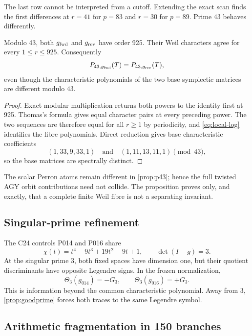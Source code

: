 The last row cannot be interpreted from a cutoff.  Extending the exact scan
finds the first differences at \(r=41\) for \(p=83\) and \(r=30\) for
\(p=89\).  Prime 43 behaves differently.

\begin{proposition}[Complete \(p=43\) finite-fibre collision]
\label{prop:p43}
Modulo 43, both \(g_{\rm fwd}\) and \(g_{\rm rev}\) have order 925.  Their
Weil characters agree for every \(1\le r\le925\).  Consequently
\[
P_{43,g_{\rm fwd}}(T)=P_{43,g_{\rm rev}}(T),
\]
even though the characteristic polynomials of the two base symplectic
matrices are different modulo 43.
\end{proposition}

\begin{proof}
Exact modular multiplication returns both powers to the identity first at
925.  Thomas's formula gives equal character pairs at every preceding power.
The two sequences are therefore equal for all \(r\ge1\) by periodicity, and
\cref{eq:local-log} identifies the fibre polynomials.  Direct reduction gives
base characteristic coefficients
\[
(1,33,9,33,1)\quad\text{and}\quad(1,11,13,11,1)
\pmod{43},
\]
so the base matrices are spectrally distinct.
\end{proof}

The scalar Perron atoms remain different in \cref{prop:p43}; hence the full
twisted AGY orbit contributions need not collide.  The proposition proves
only, and exactly, that a complete finite Weil fibre is not a separating
invariant.

\subsection{Singular-prime refinement}

The C24 controls P014 and P016 share
\[
\chi(t)=t^4-9t^3+19t^2-9t+1,
\qquad \det(I-g)=3.
\]
At the singular prime 3, both fixed spaces have dimension one, but their
quotient discriminants have opposite Legendre signs.  In the frozen
normalization,
\[
\Theta_3(g_{014})=-G_3,
\qquad
\Theta_3(g_{016})=+G_3.
\]
This is information beyond the common characteristic polynomial.  Away from
3, \cref{prop:goodprime} forces both traces to the same Legendre symbol.

\subsection{Arithmetic fragmentation in 150 branches}

